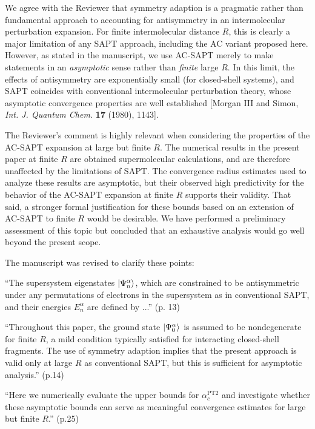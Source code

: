 \documentclass[journal=jctcce,manuscript=article]{achemso}
\newcommand*{\rev}[1]{{\color{blue} #1}}
\begin{document}
We agree with the Reviewer that symmetry adaption is a
pragmatic rather than fundamental approach to accounting for
antisymmetry in an intermolecular perturbation expansion. For finite
intermolecular distance $R$, this is clearly a major limitation of any
SAPT approach, including the AC variant proposed here. However, as
stated in the manuscript, we use AC-SAPT merely to make statements in
an \emph{asymptotic} sense rather than \emph{finite} large $R$. In this limit,
the effects of antisymmetry are exponentially small (for closed-shell
systems), and SAPT coincides with
conventional intermolecular perturbation theory, whose asymptotic
convergence properties are well established [Morgan III and Simon,
\textit{Int. J. Quantum Chem.} \textbf{17} (1980), 1143]. 

The Reviewer's comment is highly relevant when considering the
properties of the AC-SAPT expansion at large but finite $R$. The
numerical 
results in the present paper at finite $R$ are obtained supermolecular
calculations, and are therefore unaffected by the limitations
of SAPT. The convergence radius estimates used to analyze these
results are asymptotic, but their observed high predictivity for the
behavior of the AC-SAPT expansion at finite $R$ supports their
validity. That said, a stronger formal justification for these bounds
based on an extension of AC-SAPT to finite $R$ would be
desirable. We have performed a preliminary assessment of this topic but
concluded that an exhaustive analysis would go well beyond the present
scope. 

The manuscript was revised to clarify these points:

``The supersystem eigenstates $\ket{\Psi_n^\alpha}$, \rev{which are
  constrained to be antisymmetric under any permutations of electrons in
  the supersystem as in conventional SAPT,} and their energies $E^\alpha_n$
are defined by ...'' (p. 13)

``Throughout this paper, the ground state $\ket{\Psi^\alpha_0}$
is assumed to be nondegenerate for finite $R$, a mild condition typically
satisfied for interacting closed-shell fragments. \rev{The use of
  symmetry adaption implies that the present approach is valid only at
  large $R$ as conventional SAPT,\cite{doi:10.1063/1.463475} but this
  is sufficient for asymptotic analysis.}'' (p.14)

``Here we numerically evaluate the upper bounds for
$\alpha_c^{\text{PT2}}$ and investigate whether these asymptotic
bounds can serve as meaningful convergence estimates \rev{for
  large but finite $R$.}'' (p.25)
  
\end{document}
